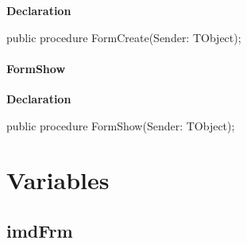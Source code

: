 \documentclass{report}
\newif\ifpdf
\begin{document}
\label{xtypefm.TimdFrm-FormCreate}
\begin{list}{}{
\setlength{\itemindent}{0cm}
\setlength{\listparindent}{0cm}
\setlength{\leftmargin}{\evensidemargin}
\addtolength{\leftmargin}{\tmplength}
\settowidth{\labelsep}{X}
\addtolength{\leftmargin}{\labelsep}
\setlength{\labelwidth}{\tmplength}
}
\item[\textbf{Declaration}\hfill]
\ifpdf
\begin{flushleft}
\fi
\begin{ttfamily}
public procedure FormCreate(Sender: TObject);\end{ttfamily}

\ifpdf
\end{flushleft}
\fi

\end{list}
\paragraph*{FormShow}\hspace*{\fill}

\label{xtypefm.TimdFrm-FormShow}
\begin{list}{}{
\setlength{\itemindent}{0cm}
\setlength{\listparindent}{0cm}
\setlength{\leftmargin}{\evensidemargin}
\addtolength{\leftmargin}{\tmplength}
\settowidth{\labelsep}{X}
\addtolength{\leftmargin}{\labelsep}
\setlength{\labelwidth}{\tmplength}
}
\item[\textbf{Declaration}\hfill]
\ifpdf
\begin{flushleft}
\fi
\begin{ttfamily}
public procedure FormShow(Sender: TObject);\end{ttfamily}

\ifpdf
\end{flushleft}
\fi

\end{list}
\section{Variables}
\ifpdf
\subsection*{\large{\textbf{imdFrm}}\normalsize\hspace{1ex}\hrulefill}
\else
\end{document}
